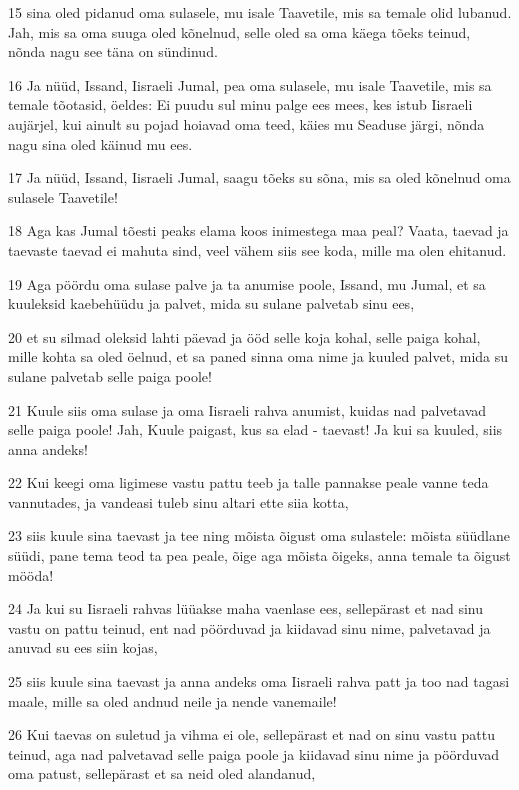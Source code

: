 \par 15 sina oled pidanud oma sulasele, mu isale Taavetile, mis sa temale olid lubanud. Jah, mis sa oma suuga oled kõnelnud, selle oled sa oma käega tõeks teinud, nõnda nagu see täna on sündinud.
\par 16 Ja nüüd, Issand, Iisraeli Jumal, pea oma sulasele, mu isale Taavetile, mis sa temale tõotasid, öeldes: Ei puudu sul minu palge ees mees, kes istub Iisraeli aujärjel, kui ainult su pojad hoiavad oma teed, käies mu Seaduse järgi, nõnda nagu sina oled käinud mu ees.
\par 17 Ja nüüd, Issand, Iisraeli Jumal, saagu tõeks su sõna, mis sa oled kõnelnud oma sulasele Taavetile!
\par 18 Aga kas Jumal tõesti peaks elama koos inimestega maa peal? Vaata, taevad ja taevaste taevad ei mahuta sind, veel vähem siis see koda, mille ma olen ehitanud.
\par 19 Aga pöördu oma sulase palve ja ta anumise poole, Issand, mu Jumal, et sa kuuleksid kaebehüüdu ja palvet, mida su sulane palvetab sinu ees,
\par 20 et su silmad oleksid lahti päevad ja ööd selle koja kohal, selle paiga kohal, mille kohta sa oled öelnud, et sa paned sinna oma nime ja kuuled palvet, mida su sulane palvetab selle paiga poole!
\par 21 Kuule siis oma sulase ja oma Iisraeli rahva anumist, kuidas nad palvetavad selle paiga poole! Jah, Kuule paigast, kus sa elad - taevast! Ja kui sa kuuled, siis anna andeks!
\par 22 Kui keegi oma ligimese vastu pattu teeb ja talle pannakse peale vanne teda vannutades, ja vandeasi tuleb sinu altari ette siia kotta,
\par 23 siis kuule sina taevast ja tee ning mõista õigust oma sulastele: mõista süüdlane süüdi, pane tema teod ta pea peale, õige aga mõista õigeks, anna temale ta õigust mööda!
\par 24 Ja kui su Iisraeli rahvas lüüakse maha vaenlase ees, sellepärast et nad sinu vastu on pattu teinud, ent nad pöörduvad ja kiidavad sinu nime, palvetavad ja anuvad su ees siin kojas,
\par 25 siis kuule sina taevast ja anna andeks oma Iisraeli rahva patt ja too nad tagasi maale, mille sa oled andnud neile ja nende vanemaile!
\par 26 Kui taevas on suletud ja vihma ei ole, sellepärast et nad on sinu vastu pattu teinud, aga nad palvetavad selle paiga poole ja kiidavad sinu nime ja pöörduvad oma patust, sellepärast et sa neid oled alandanud,
